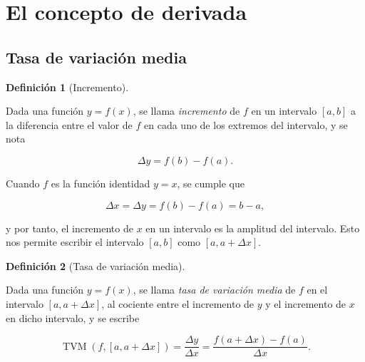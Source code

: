 \documentclass[
  a4paper,
]{scrreport}
\theoremstyle{definition}
\theoremstyle{plain}
\theoremstyle{definition}
\newtheorem{definition}{Definición}[chapter]
\theoremstyle{definition}
\theoremstyle{plain}
\theoremstyle{plain}
\theoremstyle{remark}
\begin{document}
\section{El concepto de derivada}\label{el-concepto-de-derivada}

\subsection{Tasa de variación media}\label{tasa-de-variaciuxf3n-media}

\begin{definition}[Incremento]\protect\hypertarget{def-incremento}{}\label{def-incremento}

Dada una función \(y=f(x)\), se llama \emph{incremento} de \(f\) en un
intervalo \([a,b]\) a la diferencia entre el valor de \(f\) en cada uno
de los extremos del intervalo, y se nota

\[\Delta y= f(b)-f(a).\]

\end{definition}

Cuando \(f\) es la función identidad \(y=x\), se cumple que

\[\Delta x=\Delta y= f(b)-f(a)=b-a,\]

y por tanto, el incremento de \(x\) en un intervalo es la amplitud del
intervalo. Esto nos permite escribir el intervalo \([a,b]\) como
\([a,a+\Delta x]\).

\begin{definition}[Tasa de variación
media]\protect\hypertarget{def-tasa-variacion-media}{}\label{def-tasa-variacion-media}

Dada una función \(y=f(x)\), se llama \emph{tasa de variación media} de
\(f\) en el intervalo \([a,a+\Delta x]\), al cociente entre el
incremento de \(y\) y el incremento de \(x\) en dicho intervalo, y se
escribe

\[
\operatorname{TVM}(f,[a,a+\Delta x])=\frac{\Delta y}{\Delta x}=\frac{f(a+\Delta x)-f(a)}{\Delta x}.
\]

\end{definition}
\end{document}
